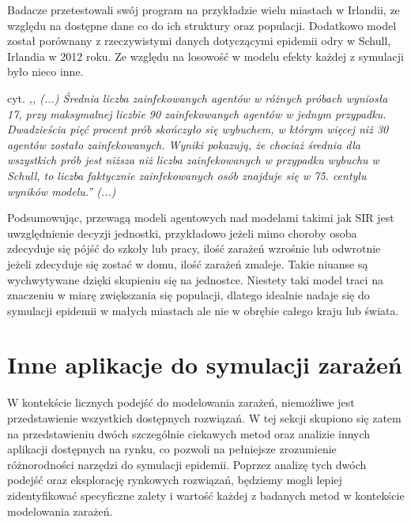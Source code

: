 Badacze przetestowali swój program na przykładzie wielu miastach w Irlandii, ze względu na dostępne dane co do ich struktury oraz populacji.
Dodatkowo model został porównany z rzeczywistymi danych dotyczącymi epidemii odry w Schull, Irlandia w 2012 roku. Ze względu na losowość w modelu efekty każdej z symulacji było nieco inne. 

cyt. \textit{,, (...) Średnia liczba zainfekowanych agentów w różnych próbach wyniosła 17, przy maksymalnej liczbie 90 zainfekowanych agentów w jednym przypadku. Dwadzieścia pięć procent prób skończyło się wybuchem, w którym więcej niż 30 agentów zostało zainfekowanych. Wyniki pokazują, że chociaż średnia dla wszystkich prób jest niższa niż liczba zainfekowanych w przypadku wybuchu w Schull, to liczba faktycznie zainfekowanych osób znajduje się w 75. centylu wyników modelu.'' (...)} \cite{bib:artykul1}

Podsumowując, przewagą modeli agentowych nad modelami takimi jak SIR jest uwzględnienie decyzji jednostki, przykładowo jeżeli mimo choroby osoba zdecyduje się pójść do szkoły lub pracy, ilość zarażeń wzrośnie lub odwrotnie jeżeli zdecyduje się zostać w domu, ilość zarażeń zmaleje. Takie niuanse są wychwytywane dzięki skupieniu się na jednostce. Niestety taki model traci na znaczeniu w miarę zwiększania się populacji, dlatego idealnie nadaje się do symulacji epidemii w małych miastach ale nie w obrębie całego kraju lub świata.

\section{\textbf{Inne aplikacje do symulacji zarażeń}}

W kontekście licznych podejść do modelowania zarażeń, niemożliwe jest przedstawienie wszystkich dostępnych rozwiązań. W tej sekcji skupiono się zatem na przedstawieniu dwóch szczególnie ciekawych metod oraz analizie innych aplikacji dostępnych na rynku, co pozwoli na pełniejsze zrozumienie różnorodności narzędzi do symulacji epidemii. Poprzez analizę tych dwóch podejść oraz eksplorację rynkowych rozwiązań, będziemy mogli lepiej zidentyfikować specyficzne zalety i wartość każdej z badanych metod w kontekście modelowania zarażeń.

